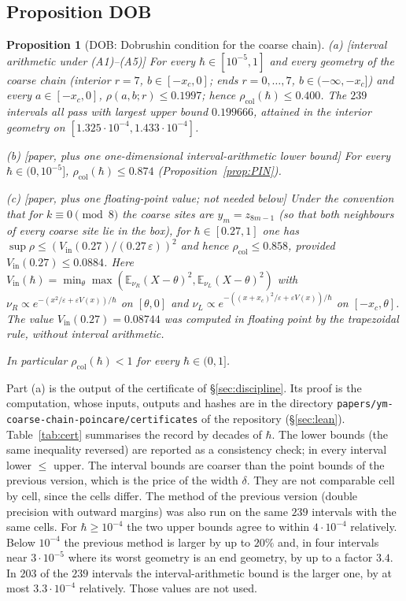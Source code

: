 \documentclass[11pt,a4paper]{article}
\newtheorem{proposition}[theorem]{Proposition}
\theoremstyle{definition}
\theoremstyle{remark}
\newcommand{\E}{\mathbb{E}}
\newcommand{\xc}{x_c}
\newcommand{\rcol}{\rho_{\mathrm{col}}}
\newcommand{\code}[1]{\texttt{#1}}
\begin{document}
\subsection{Proposition DOB}

\begin{proposition}[DOB: Dobrushin condition for the coarse chain]\label{prop:DOB}
\textup{(a) [interval arithmetic under (A1)--(A5)]} For every $\hbar\in[10^{-5},1]$ and every geometry of the coarse chain \textup{(}interior $r=7$, $b\in[-\xc,0]$; ends $r=0,\dots,7$, $b\in(-\infty,-\xc]$\textup{)} and every $a\in[-\xc,0]$, $\rho(a,b;r)\le0.1997$; hence $\rcol(\hbar)\le0.400$. The $239$ intervals all pass with largest upper bound $0.199666$, attained in the interior geometry on $[1.325\cdot10^{-4},1.433\cdot10^{-4}]$.

\textup{(b) [paper, plus one one-dimensional interval-arithmetic lower bound]} For every $\hbar\in(0,10^{-5}]$, $\rcol(\hbar)\le0.874$ \textup{(}Proposition~\ref{prop:PIN}\textup{)}.

\textup{(c) [paper, plus one floating-point value; not needed below]} Under the convention that for $k\equiv0\pmod 8$ the coarse sites are $y_m=z_{8m-1}$ \textup{(}so that both neighbours of every coarse site lie in the box\textup{)}, for $\hbar\in[0.27,1]$ one has $\sup\rho\le(V_{\mathrm{in}}(0.27)/(0.27\,\varepsilon))^2$ and hence $\rcol\le0.858$, provided $V_{\mathrm{in}}(0.27)\le0.0884$. Here $V_{\mathrm{in}}(\hbar)=\min_\theta\max(\E_{\nu_R}(X-\theta)^2,\E_{\nu_L}(X-\theta)^2)$ with $\nu_R\propto e^{-(x^2/\varepsilon+\varepsilon V(x))/\hbar}$ on $[\theta,0]$ and $\nu_L\propto e^{-((x+\xc)^2/\varepsilon+\varepsilon V(x))/\hbar}$ on $[-\xc,\theta]$. The value $V_{\mathrm{in}}(0.27)=0.08744$ was computed in floating point by the trapezoidal rule, without interval arithmetic.

In particular $\rcol(\hbar)<1$ for every $\hbar\in(0,1]$.
\end{proposition}

Part (a) is the output of the certificate of \S\ref{sec:discipline}. Its proof is the computation, whose inputs, outputs and hashes are in the directory \code{papers/ym-coarse-chain-poincare/certificates} of the repository (\S\ref{sec:lean}). Table~\ref{tab:cert} summarises the record by decades of $\hbar$. The lower bounds (the same inequality reversed) are reported as a consistency check; in every interval lower $\le$ upper. The interval bounds are coarser than the point bounds of the previous version, which is the price of the width $\delta$. They are not comparable cell by cell, since the cells differ. The method of the previous version (double precision with outward margins) was also run on the same $239$ intervals with the same cells. For $\hbar\ge10^{-4}$ the two upper bounds agree to within $4\cdot10^{-4}$ relatively. Below $10^{-4}$ the previous method is larger by up to $20\%$ and, in four intervals near $3\cdot10^{-5}$ where its worst geometry is an end geometry, by up to a factor $3.4$. In $203$ of the $239$ intervals the interval-arithmetic bound is the larger one, by at most $3.3\cdot10^{-4}$ relatively. Those values are not used.
\end{document}
